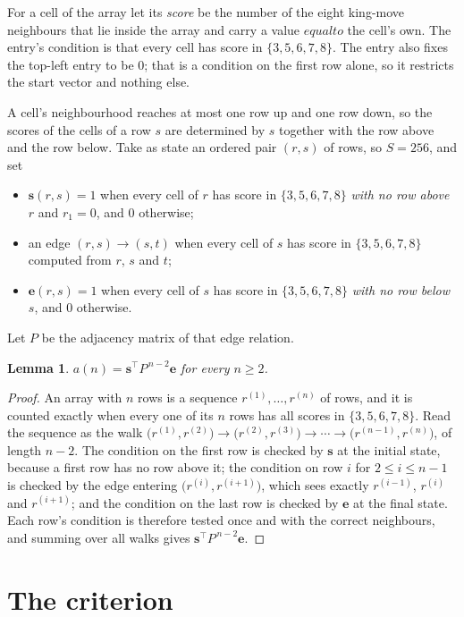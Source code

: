 \documentclass[11pt,a4paper]{article}
\theoremstyle{plain}
\newtheorem{lemma}[theorem]{Lemma}
\theoremstyle{definition}
\begin{document}
For a cell of the array let its \emph{score} be the number of the eight king-move neighbours that lie inside
the array and carry a value $equal to$ the cell's own. The entry's condition is that every cell
has score in $\{3,5,6,7,8\}$. The entry also fixes the top-left entry to be $0$; that is a condition on the first row alone, so it restricts the start vector and nothing else.

A cell's neighbourhood reaches at most one row up and one row down, so the scores of the
cells of a row $s$ are determined by $s$ together with the row above and the row below.
Take as state an ordered pair $(r,s)$ of rows, so $S=256$, and set
\begin{itemize}
\item $\mathbf{s}(r,s)=1$ when every cell of $r$ has score in $\{3,5,6,7,8\}$ \emph{with no row
above $r$} and $r_1=0$, and $0$ otherwise;
\item an edge $(r,s)\to(s,t)$ when every cell of $s$ has score in $\{3,5,6,7,8\}$ computed from
$r$, $s$ and $t$;
\item $\mathbf{e}(r,s)=1$ when every cell of $s$ has score in $\{3,5,6,7,8\}$ \emph{with no row
below $s$}, and $0$ otherwise.
\end{itemize}
Let $P$ be the adjacency matrix of that edge relation.

\begin{lemma}\label{lem:walk}
$a(n)=\mathbf{s}^{\!\top}P^{\,n-2}\mathbf{e}$ for every $n\ge2$.
\end{lemma}

\begin{proof}
An array with $n$ rows is a sequence $r^{(1)},\dots,r^{(n)}$ of rows, and it is counted
exactly when every one of its $n$ rows has all scores in $\{3,5,6,7,8\}$. Read the sequence as the
walk $\bigl(r^{(1)},r^{(2)}\bigr)\to\bigl(r^{(2)},r^{(3)}\bigr)\to\cdots\to
\bigl(r^{(n-1)},r^{(n)}\bigr)$, of length $n-2$. The condition on the first row is
checked by $\mathbf{s}$ at the initial state, because a first row has no row above it; the
condition on row $i$ for $2\le i\le n-1$ is checked by the edge entering
$\bigl(r^{(i)},r^{(i+1)}\bigr)$, which sees exactly $r^{(i-1)}$, $r^{(i)}$ and
$r^{(i+1)}$; and the condition on the last row is checked by $\mathbf{e}$ at the final
state. Each row's condition is therefore tested once and with the correct neighbours, and
summing over all walks gives $\mathbf{s}^{\!\top}P^{\,n-2}\mathbf{e}$.
\end{proof}

\section{The criterion}
\end{document}
